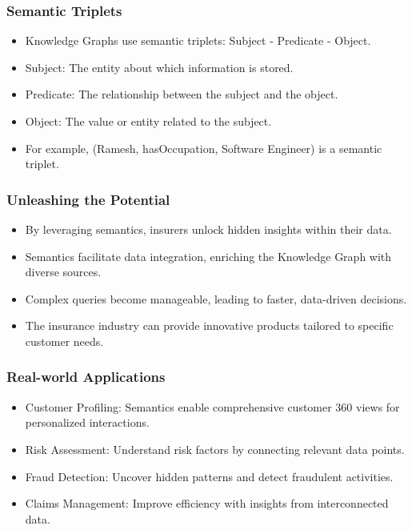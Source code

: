 \begin{frame}[fragile]\frametitle{Semantic Triplets}
  \begin{itemize}
    \item Knowledge Graphs use semantic triplets: Subject - Predicate - Object.
    \item Subject: The entity about which information is stored.
    \item Predicate: The relationship between the subject and the object.
    \item Object: The value or entity related to the subject.
    \item For example, (Ramesh, hasOccupation, Software Engineer) is a semantic triplet.
  \end{itemize}
\end{frame}

\begin{frame}[fragile]\frametitle{Unleashing the Potential}
  \begin{itemize}
    \item By leveraging semantics, insurers unlock hidden insights within their data.
    \item Semantics facilitate data integration, enriching the Knowledge Graph with diverse sources.
    \item Complex queries become manageable, leading to faster, data-driven decisions.
    \item The insurance industry can provide innovative products tailored to specific customer needs.
  \end{itemize}
\end{frame}

\begin{frame}[fragile]\frametitle{Real-world Applications}
  \begin{itemize}
    \item Customer Profiling: Semantics enable comprehensive customer 360 views for personalized interactions.
    \item Risk Assessment: Understand risk factors by connecting relevant data points.
    \item Fraud Detection: Uncover hidden patterns and detect fraudulent activities.
    \item Claims Management: Improve efficiency with insights from interconnected data.
  \end{itemize}
\end{frame}


